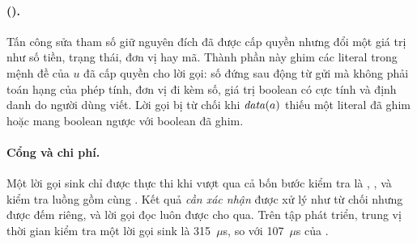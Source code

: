 \paragraph{\PThree{} (\cThree).} Tấn công sửa tham số giữ nguyên đích đã được cấp quyền nhưng đổi một giá trị như số
tiền, trạng thái, đơn vị hay mã. Thành phần này ghim các literal trong mệnh đề của $u$ đã cấp quyền cho lời gọi: số đứng
sau động từ gửi mà không phải toán hạng của phép tính, đơn vị đi kèm số, giá trị boolean có cực tính và định danh do
người dùng viết. Lời gọi bị từ chối khi $\mathit{data}(a)$ thiếu một literal đã ghim hoặc mang boolean ngược với boolean đã ghim.

\paragraph{Cổng và chi phí.} Một lời gọi sink chỉ được thực thi khi vượt qua cả bốn bước kiểm tra là \rSig, \pOne,
\pThree{} và kiểm tra luồng gồm \rFlow{} cùng \pTwo. Kết quả \emph{cần xác nhận} được xử lý như từ chối nhưng được đếm
riêng, và lời gọi đọc luôn được cho qua. Trên tập phát triển, trung vị thời gian kiểm tra một lời gọi sink là
315~$\mu$s, so với 107~$\mu$s của \strSand.
